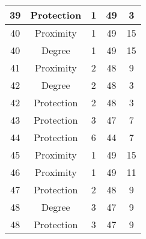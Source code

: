 \documentclass[results.tex]{subfiles}
\begin{document}
\begin{center}
\begin{tabular}{| c || c | c | c | c |}
            \hline
            39                      & Protection                   & 1                      & 49                      & 3                    \\
            \hline
            40                      & Proximity                    & 1                      & 49                      & 15                   \\
            \hline
            40                      & Degree                       & 1                      & 49                      & 15                   \\
            \hline
            41                      & Proximity                    & 2                      & 48                      & 9                    \\
            \hline
            42                      & Degree                       & 2                      & 48                      & 3                    \\
            \hline
            42                      & Protection                   & 2                      & 48                      & 3                    \\
            \hline
            43                      & Protection                   & 3                      & 47                      & 7                    \\
            \hline
            44                      & Protection                   & 6                      & 44                      & 7                    \\
            \hline
            45                      & Proximity                    & 1                      & 49                      & 15                   \\
            \hline
            46                      & Proximity                    & 1                      & 49                      & 11                   \\
            \hline
            47                      & Protection                   & 2                      & 48                      & 9                    \\
            \hline
            48                      & Degree                       & 3                      & 47                      & 9                    \\
            \hline
            48                      & Protection                   & 3                      & 47                      & 9                    \\

\end{tabular}
\end{center}
\end{document}
